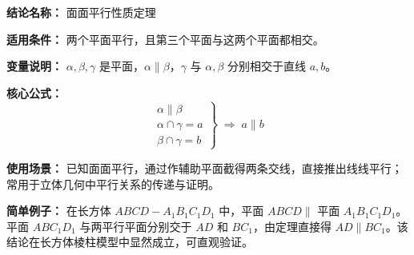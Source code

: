 \textbf{结论名称：} 面面平行性质定理

\textbf{适用条件：} 两个平面平行，且第三个平面与这两个平面都相交。

\textbf{变量说明：} \(\alpha,\beta,\gamma\) 是平面，\(\alpha\parallel\beta\)，\(\gamma\) 与 \(\alpha,\beta\) 分别相交于直线 \(a,b\)。

\textbf{核心公式：} 
\[
\boxed{\left.\begin{array}{c}
\alpha\parallel\beta\\[2pt]
\alpha\cap\gamma=a\\[2pt]
\beta\cap\gamma=b
\end{array}\right\} \;\Rightarrow\; a\parallel b}
\]

\textbf{使用场景：} 已知面面平行，通过作辅助平面截得两条交线，直接推出线线平行；常用于立体几何中平行关系的传递与证明。

\textbf{简单例子：} 
在长方体 \(ABCD-A_1B_1C_1D_1\) 中，平面 \(ABCD\parallel\) 平面 \(A_1B_1C_1D_1\)。
平面 \(ABC_1D_1\) 与两平行平面分别交于 \(AD\) 和 \(BC_1\)，由定理直接得 \(AD\parallel BC_1\)。该结论在长方体棱柱模型中显然成立，可直观验证。